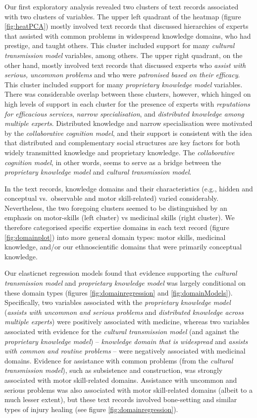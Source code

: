 \documentclass[
  11pt,
]{article}
\begin{document}
Our first exploratory analysis revealed two clusters of text records associated with two clusters of variables. The upper left quadrant of the heatmap (figure \ref{fig:heatPCA}) mostly involved text records that discussed hierarchies of experts that assisted with common problems in widespread knowledge domains, who had prestige, and taught others. This cluster included support for many \emph{cultural transmission model} variables, among others. The upper right quadrant, on the other hand, mostly involved text records that discussed experts who \emph{assist with serious, uncommon problems} and who were \emph{patronised based on their efficacy}. This cluster included support for many \emph{proprietary knowledge model} variables. There was considerable overlap between these clusters, however, which hinged on high levels of support in each cluster for the presence of experts with \emph{reputations for efficacious services}, \emph{narrow specialisation}, and \emph{distributed knowledge among multiple experts}. Distributed knowledge and narrow specialisation were motivated by the \emph{collaborative cognition model}, and their support is consistent with the idea that distributed and complementary social structures are key factors for both widely transmitted knowledge and proprietary knowledge. The \emph{collaborative cognition model}, in other words, seems to serve as a bridge between the \emph{proprietary knowledge model} and \emph{cultural transmission model}.

In the text records, knowledge domains and their characteristics (e.g., hidden and conceptual vs.~observable and motor skill-related) varied considerably. Nevertheless, the two foregoing clusters seemed to be distinguished by an emphasis on motor-skills (left cluster) vs medicinal skills (right cluster). We therefore categorised specific expertise domains in each text record (figure \ref{fig:domainplot}) into more general domain types: motor skills, medicinal knowledge, and/or our ethnoscientific domains that were primarily conceptual knowledge.

Our elasticnet regression models found that evidence supporting the \emph{cultural transmission model} and \emph{proprietary knowledge model} was largely conditional on these domain types (figures \ref{fig:domainregression} and \ref{fig:domainModels}). Specifically, two variables associated with the \emph{proprietary knowledge model} (\emph{assists with uncommon and serious problems} and \emph{distributed knowledge across multiple experts}) were positively associated with medicine, whereas two variables associated with evidence for the \emph{cultural transmission model} (and against the \emph{proprietary knowledge model}) -- \emph{knowledge domain that is widespread} and \emph{assists with common and routine problems} -- were negatively associated with medicinal domains. Evidence for assistance with common problems (from the \emph{cultural transmission model}), such as subsistence and construction, was strongly associated with motor skill-related domains. Assistance with uncommon and serious problems was also associated with motor skill-related domains (albeit to a much lesser extent), but these text records involved bone-setting and similar types of injury healing (see figure \ref{fig:domainregression}).
\end{document}
